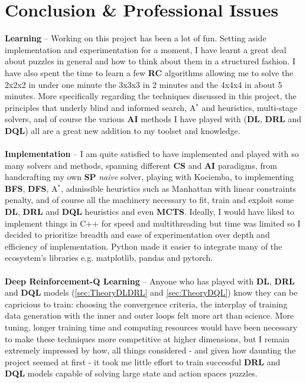 
\chapter{Conclusion \& Professional Issues} %

\label{Conclusion} %



\textbf{Learning} -- Working on this project has been a lot of fun. Setting aside implementation and experimentation for a moment, I have learnt a great deal about puzzles in general and how to think about them in a structured fashion. I have also spent the time to learn a few \textbf{RC} algorithms allowing me to solve the 2x2x2 in under one minute the 3x3x3 in 2 minutes and the 4x4x4 in about 5 minutes. More specifically regarding the techniques discussed in this project, the principles that underly blind and informed search, A$^{*}$ and heuristics, multi-stage solvers, and of course the various \textbf{AI} methods I have played with (\textbf{DL}, \textbf{DRL} and \textbf{DQL}) all are a great new addition to my toolset and knowledge.
\\
\\
\textbf{Implementation} -- I am quite satisfied to have implemented and played with so many solvers and methods, spanning different \textbf{CS} and \textbf{AI} paradigms, from handcrafting my own \textbf{SP} \textit{naive} solver, playing with Kociemba, to implementing \textbf{BFS}, \textbf{DFS}, A$^{*}$, admissible heuristics such as Manhattan with linear constraints penalty, and of course all the machinery necessary to fit, train and exploit some \textbf{DL}, \textbf{DRL} and \textbf{DQL} heuristics and even \textbf{MCTS}. Ideally, I would have liked to implement things in C++ for speed and multithreading but time was limited so I decided to prioritize breadth and ease of experimentation over depth and efficiency of implementation. Python made it easier to integrate many of the ecosystem's libraries e.g. matplotlib, pandas and pytorch.
\\
\\
\textbf{Deep Reinforcement-Q Learning} -- Anyone who has played with \textbf{DL}, \textbf{DRL} and \textbf{DQL} models (\ref{sec:TheoryDLDRL} and \ref{sec:TheoryDQL}) know they can be capricious to train: choosing the convergence criteria, the interplay of training data generation with the inner and outer loops felt more art than science. More tuning, longer training time and computing resources would have been necessary to make these techniques more competitive at higher dimensions, but I remain extremely impressed by how, all things considered - and given how daunting the project seemed at first - it took me little effort to train successful \textbf{DRL} and \textbf{DQL} models capable of solving large state and action spaces puzzles.
